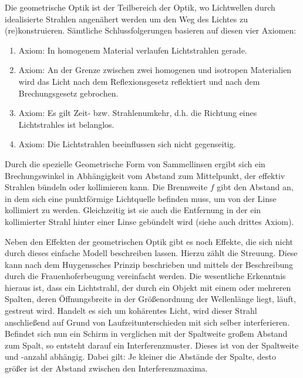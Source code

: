 
Die geometrische Optik ist der Teilbereich der Optik, wo Lichtwellen durch idealisierte Strahlen angenähert werden um den Weg des Lichtes zu (re)konstruieren. Sämtliche Schlussfolgerungen basieren auf diesen vier Axiomen:

\begin{enumerate}
	\item{Axiom:} In homogenem Material verlaufen Lichtstrahlen gerade.
	\item{Axiom:} An der Grenze zwischen zwei homogenen und isotropen Materialien wird das Licht nach dem Reflexionsgesetz reflektiert und nach dem Brechungsgesetz gebrochen.
	\item{Axiom:} Es gilt Zeit- bzw. Strahlenumkehr, d.h. die Richtung eines Lichtstrahles ist belanglos.
	\item{Axiom:} Die Lichtstrahlen beeinflussen sich nicht gegenseitig.
\end{enumerate}

Durch die spezielle Geometrische Form von Sammellinsen ergibt sich ein Brechungswinkel in Abhängigkeit vom Abstand zum Mittelpunkt, der effektiv Strahlen bündeln oder kollimieren kann. Die Brennweite $f$ gibt den Abstand an, in dem sich eine punktförmige Lichtquelle befinden muss, um von der Linse kollimiert zu werden. Gleichzeitig ist sie auch die Entfernung in der ein kollimierter Strahl hinter einer Linse gebündelt wird (siehe auch drittes Axiom).

Neben den Effekten der geometrischen Optik gibt es noch Effekte, die sich nicht durch dieses einfache Modell beschreiben lassen. Hierzu zählt die Streuung. Diese kann nach dem Huygenssches Prinzip  \cite{_huygenssches_????} beschrieben und mittels der Beschreibung durch die Frauenhoferbeugung \cite{_beugungsintegral_2015} \cite[Kap. 2]{stossel_fourieroptik:_1993} vereinfacht werden. Die wesentliche Erkenntnis hieraus ist, dass ein Lichtstrahl, der durch ein Objekt mit einem oder mehreren Spalten, deren Öffnungsbreite in der Größenordnung der Wellenlänge liegt, läuft, gestreut wird. Handelt es sich um kohärentes Licht, wird dieser Strahl anschließend auf Grund von Laufzeitunterschieden mit sich selber interferieren.
Befindet sich nun ein Schirm in verglichen mit der Spaltweite großem Abstand zum Spalt, so entsteht darauf ein Interferenzmuster. Dieses ist von der Spaltweite und -anzahl abhängig. Dabei gilt: Je kleiner die Abstände der Spalte, desto größer ist der Abstand zwischen den Interferenzmaxima.


